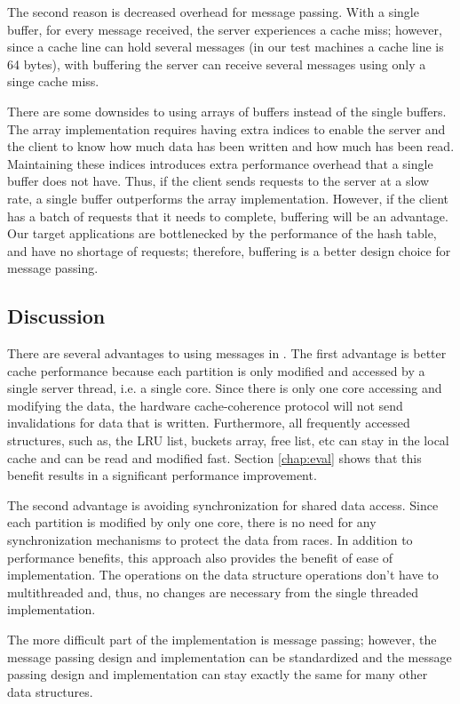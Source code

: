 The second reason is decreased overhead for message passing.  With a single
buffer, for every message received, the server experiences a cache miss;
however, since a cache line can hold several messages (in our test machines a
cache line is 64 bytes), with buffering the server can receive several messages
using only a singe cache miss.

There are some downsides to using arrays of buffers instead of the single
buffers.  The array implementation requires having extra indices to enable the
server and the client to know how much data has been written and how much has
been read. Maintaining these indices introduces extra performance overhead that
a single buffer does not have. Thus, if the client sends requests to the server
at a slow rate, a single buffer outperforms the array implementation. However,
if the client has a batch of requests that it needs to complete, buffering will
be an advantage. Our target applications are bottlenecked by the performance of
the hash table, and have no shortage of requests; therefore, buffering is a
better design choice for message passing.

\subsection{Discussion}
\label{sec:compmigration}

There are several advantages to using messages in \cphash{}. The first advantage
is better cache performance because each partition is only modified and accessed
by a single server thread, i.e. a single core.  Since there is only one core
accessing and modifying the data, the hardware cache-coherence protocol will not
send invalidations for data that is written. Furthermore, all frequently
accessed structures, such as, the LRU list, buckets array, free list, etc can
stay in the local cache and can be read and modified fast.  Section
\ref{chap:eval} shows that this benefit results in a significant performance
improvement.

The second advantage is avoiding synchronization for shared data access. Since
each partition is modified by only one core, there is no need for any
synchronization mechanisms to protect the data from races. In addition to
performance benefits, this approach also provides the benefit of ease of
implementation.  The operations on the data structure operations don't have to
multithreaded and, thus, no changes are necessary from the single threaded
implementation.

The more difficult part of the \cphash{} implementation is message passing;
however, the message passing design and implementation can be standardized and
the message passing design and implementation can stay exactly the same for many
other data structures.

